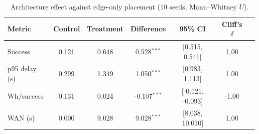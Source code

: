 \begin{table}
\centering
\small
\caption{Architecture effect against edge-only placement (10 seeds, Mann--Whitney $U$).}
\label{tab:p1-tests}
\begin{tabular}{lcccccc}
\toprule
Metric & Control & Treatment & Difference & 95\% CI & Cliff's $\delta$ \\
\midrule
Success & 0.121 & 0.648 & 0.528$^{***}$ & [0.515, 0.541] & 1.00 \\
p95 delay (s) & 0.299 & 1.349 & 1.050$^{***}$ & [0.983, 1.113] & 1.00 \\
Wh/success & 0.131 & 0.024 & -0.107$^{***}$ & [-0.121, -0.093] & -1.00 \\
WAN (s) & 0.000 & 9.028 & 9.028$^{***}$ & [8.038, 10.010] & 1.00 \\
\bottomrule
\end{tabular}
\par{}
\end{table}
